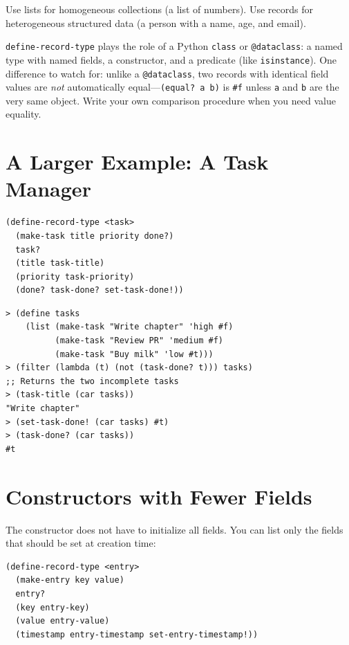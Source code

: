 Use lists for homogeneous collections (a list of numbers). Use records for heterogeneous structured data (a person with a name, age, and email).

\begin{note}
\texttt{define-record-type} plays the role of a Python \texttt{class} or \texttt{@dataclass}: a named type with named fields, a constructor, and a predicate (like \texttt{isinstance}). One difference to watch for: unlike a \texttt{@dataclass}, two records with identical field values are \emph{not} automatically equal---\texttt{(equal? a b)} is \texttt{\#f} unless \texttt{a} and \texttt{b} are the very same object. Write your own comparison procedure when you need value equality.
\end{note}

\section{A Larger Example: A Task Manager}

\begin{lstlisting}
(define-record-type <task>
  (make-task title priority done?)
  task?
  (title task-title)
  (priority task-priority)
  (done? task-done? set-task-done!))
\end{lstlisting}

\begin{lstlisting}[style=repl]
> (define tasks
    (list (make-task "Write chapter" 'high #f)
          (make-task "Review PR" 'medium #f)
          (make-task "Buy milk" 'low #t)))
> (filter (lambda (t) (not (task-done? t))) tasks)
;; Returns the two incomplete tasks
> (task-title (car tasks))
"Write chapter"
> (set-task-done! (car tasks) #t)
> (task-done? (car tasks))
#t
\end{lstlisting}

\section{Constructors with Fewer Fields}

The constructor does not have to initialize all fields. You can list only the fields that should be set at creation time:

\begin{lstlisting}
(define-record-type <entry>
  (make-entry key value)
  entry?
  (key entry-key)
  (value entry-value)
  (timestamp entry-timestamp set-entry-timestamp!))
\end{lstlisting}

